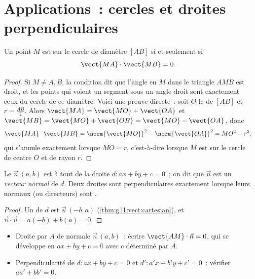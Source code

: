 \section{Applications~: cercles et droites perpendiculaires}

\begin{proposition}\label{prop:g11:scal:diameter}
Un point $M$ est sur le cercle de diamètre $[AB]$ si et seulement si
\[
\vect{MA} \cdot \vect{MB} = 0 .
\]
\end{proposition}

\begin{proof}
Si $M \neq A, B$, la condition dit que l'angle en $M$ dans le triangle
$AMB$ est droit, et les points qui voient un segment sous un angle droit
sont exactement ceux du cercle de ce diamètre. Voici une preuve directe~:
soit $O$ le  de $[AB]$ et $r = \frac{AB}{2}$. Alors
$\vect{MA} = \vect{MO} + \vect{OA}$ et
$\vect{MB} = \vect{MO} + \vect{OB} = \vect{MO} - \vect{OA}$, donc
\[
\vect{MA}\cdot\vect{MB}
= \norm{\vect{MO}}^2 - \norm{\vect{OA}}^2 = MO^2 - r^2,
\]
qui s'annule exactement lorsque $MO = r$, c'est-à-dire lorsque $M$ est
sur le cercle de centre $O$ et de rayon $r$.
\end{proof}

\begin{proposition}\label{prop:g11:scal:normal}
Le  $\vec n\,(a, b)$ est  à tout  de la
droite $d : ax + by + c = 0$~; on dit que $\vec n$ est un \emph{vecteur
normal} de $d$. Deux droites sont perpendiculaires
exactement lorsque leurs  normaux (ou directeurs) sont
.
\end{proposition}

\begin{proof}
Un  de $d$ est $\vec u\,(-b, a)$
(\cref{thm:g11:vect:cartesian}), et
$\vec n \cdot \vec u = a(-b) + b(a) = 0$.
\end{proof}

\begin{method}\label{met:g11:scal:normal}
\begin{itemize}
  \item Droite par $A$ de normale $\vec n\,(a,b)$~: écrire
        $\vect{AM} \cdot \vec n = 0$, qui se développe en
        $ax + by + c = 0$ avec $c$ déterminé par $A$.
  \item Perpendicularité de $d: ax+by+c = 0$ et $d': a'x+b'y+c' = 0$~:
        vérifier $aa' + bb' = 0$.
\end{itemize}
\end{method}

